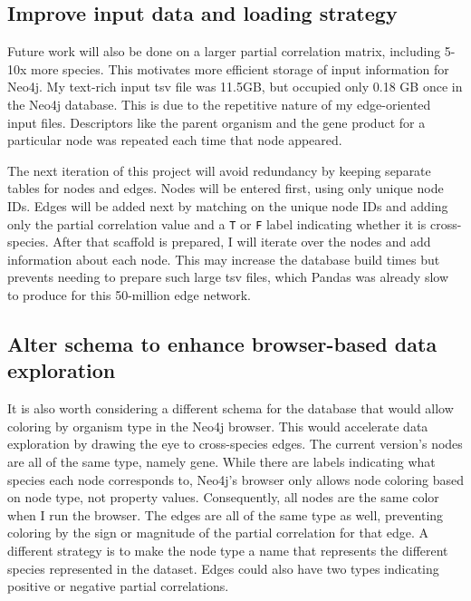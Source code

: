 \documentclass[12pt]{article}
\begin{document}
\subsection{Improve input data and loading strategy}
Future work will also be done on a larger partial correlation matrix, including 5-10x more species.  
This motivates more efficient storage of input information for Neo4j. 
My text-rich input tsv file was 11.5GB, but occupied only 0.18 GB  once in the Neo4j database.
This is due to the repetitive nature of my edge-oriented input files. 
Descriptors like the parent organism and the gene product for a particular node was repeated each time that node appeared.

The next iteration of this project will avoid redundancy by keeping separate tables for nodes and edges.
Nodes will be entered first, using only unique node IDs.
Edges will be added next by matching on the unique node IDs and adding only the partial correlation value and a \texttt{T} or \texttt{F} label indicating whether it is cross-species.
After that scaffold is prepared, I will iterate over the nodes and add information about each node.  
This may increase the database build times but prevents needing to prepare such large tsv files, which Pandas was already slow to produce for this 50-million edge network.

\subsection{Alter schema to enhance browser-based data exploration}
It is also worth considering a different schema for the database that would allow coloring by organism type in the Neo4j browser.
This would accelerate data exploration by drawing the eye to cross-species edges. 
The current version's nodes are all of the same type, namely gene.  
While there are labels indicating what species each node corresponds to, Neo4j's browser only allows node coloring based on node type, not property values.
Consequently, all nodes are the same color when I run the browser.  
The edges are all of the same type as well, preventing coloring by the sign or magnitude of the partial correlation for that edge. 
A different strategy is to make the node type a name that represents the different species represented in the dataset.
Edges could also have two types indicating positive or negative partial correlations. 
\end{document}
